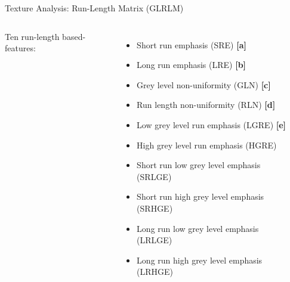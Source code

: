 \documentclass[10pt,aspectratio=169]{beamer}
\begin{document}
\begin{frame}{Texture Analysis: Run-Length Matrix (GLRLM)}
  \begin{columns}[onlytextwidth]
    Ten run-length based-features:
    \begin{itemize}
       \item Short run emphasis (SRE) \textbf{[a]}
       \item Long run emphasis (LRE) \textbf{[b]}
       \item Grey level non-uniformity (GLN) \textbf{[c]}
       \item Run length non-uniformity (RLN) \textbf{[d]}
       \item Low grey level run emphasis (LGRE) \textbf{[e]}
       \item High grey level run emphasis (HGRE)
       \item Short run low grey level emphasis (SRLGE)
       \item Short run high grey level emphasis (SRHGE)
       \item Long run low grey level emphasis (LRLGE)
       \item Long run high grey level emphasis (LRHGE)
    \end{itemize}
    \begin{columns}
      \centering
      \centering
      \\
      \vspace{0.3mm}
      \\
      \vspace{0.3mm}
      \centering
      \\
      \vspace{0.3mm}
      \\
      \vspace{0.3mm}
    \end{columns}
  \end{columns}
\end{frame}
\end{document}
